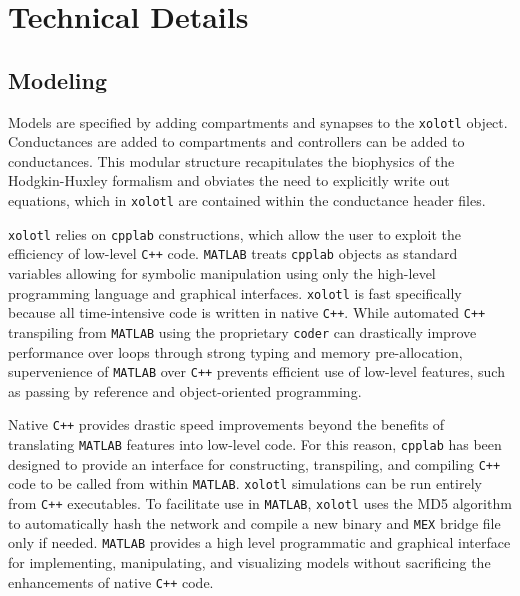 \documentclass{frontiersSCNS} %
\begin{document}
%
%
%
%
%
%


\section{Technical Details}

\subsection{Modeling}

Models are specified by adding compartments and synapses to the \texttt{xolotl} object. Conductances are added to compartments and controllers can be added to conductances. This modular structure recapitulates the biophysics of the Hodgkin-Huxley formalism and obviates the need to explicitly write out equations, which in \texttt{xolotl} are contained within the conductance header files.

\texttt{xolotl} relies on \texttt{cpplab} constructions, which allow the user to exploit the efficiency of low-level \texttt{C++} code. \texttt{MATLAB} treats \texttt{cpplab} objects as standard variables allowing for symbolic manipulation using only the high-level programming language and graphical interfaces. \texttt{xolotl} is fast specifically because all time-intensive code is written in native \texttt{C++}. While automated \texttt{C++} transpiling from \texttt{MATLAB} using the proprietary \texttt{coder} can drastically improve performance over loops through strong typing and memory pre-allocation, supervenience of \texttt{MATLAB} over \texttt{C++} prevents efficient use of low-level features, such as passing by reference and object-oriented programming. 

Native \texttt{C++} provides drastic speed improvements beyond the benefits of translating \texttt{MATLAB} features into low-level code. For this reason, \texttt{cpplab} has been designed to provide an interface for constructing, transpiling, and compiling \texttt{C++} code to be called from within \texttt{MATLAB}. \texttt{xolotl} simulations can be run entirely from \texttt{C++} executables. To facilitate use in \texttt{MATLAB}, \texttt{xolotl} uses the MD5 algorithm to automatically hash the network and compile a new binary and \texttt{MEX} bridge file only if needed. \texttt{MATLAB} provides a high level programmatic and graphical interface for implementing, manipulating, and visualizing models without sacrificing the enhancements of native \texttt{C++} code.
\end{document}

